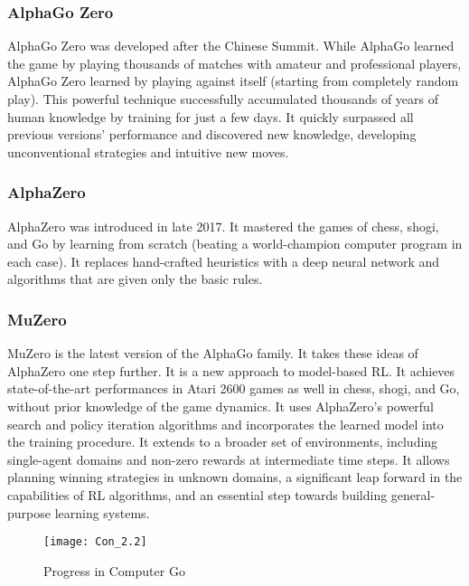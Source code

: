\subsubsection*{AlphaGo Zero} AlphaGo Zero\cite{b35} was developed after the Chinese Summit. While AlphaGo learned the game by playing thousands of matches with amateur and professional players, AlphaGo Zero learned by playing against itself (starting from completely random play). This powerful technique successfully accumulated thousands of years of human knowledge by training for just a few days. It quickly surpassed all previous versions' performance and discovered new knowledge, developing unconventional strategies and intuitive new moves. 

\subsubsection*{AlphaZero} AlphaZero\cite{b36} was introduced in late 2017. It mastered the games of chess, shogi, and Go by learning from scratch (beating a world-champion computer program in each case). It replaces hand-crafted heuristics with a deep neural network and algorithms that are given only the basic rules. 

\subsubsection*{MuZero} MuZero\cite{b13} is the latest version of the AlphaGo family. It takes these ideas of AlphaZero one step further. It is a new approach to model-based RL. It achieves state-of-the-art performances in Atari 2600 games as well in chess, shogi, and Go, without prior knowledge of the game dynamics. It uses AlphaZero's powerful search and policy iteration algorithms and incorporates the learned model into the training procedure. It extends to a broader set of environments, including single-agent domains and non-zero rewards at intermediate time steps. It allows planning winning strategies in unknown domains, a significant leap forward in the capabilities of RL algorithms, and an essential step towards building general-purpose learning systems.  

\begin{figure}[t]
    \centering
    \texttt{[image: Con\_2.2]}
    \caption{Progress in Computer Go\cite{b26}}
    \label{Prog_comp_go}
\end{figure}